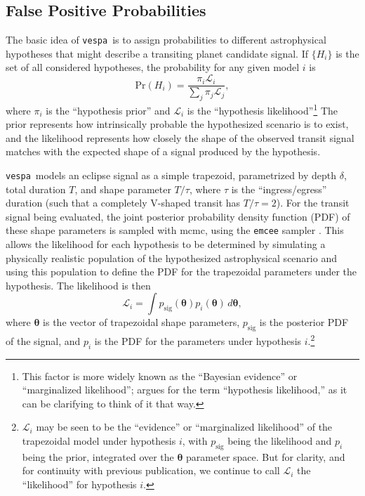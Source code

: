 \documentclass[preprint2]{aastex}
\newcommand{\vespa}{\texttt{vespa}}
\newcommand{\bvec}[1]{{\ensuremath{\boldsymbol{#1}}}}
\begin{document}

\subsection{False Positive Probabilities}
\label{sec:methods:fpp}

The basic idea of \vespa\ is to assign probabilities to different
astrophysical hypotheses that might describe a transiting planet
candidate signal.  If $\{H_i\}$ is the set of all considered
hypotheses, the probability for any given model $i$ is
\begin{equation}
  \label{eq:prob}
  \mathrm{Pr}\left(H_i\right) = \frac{\pi_i \mathcal
    L_i}{\displaystyle \sum_j \pi_j \mathcal L_j},
\end{equation}
where $\pi_i$ is the ``hypothesis prior'' and $\mathcal L_i$ is the
``hypothesis likelihood''\footnote{This factor is more widely known as
  the ``Bayesian evidence'' or ``marginalized likelihood'';
  \citet{Morton:2014b} argues for the term ``hypothesis likelihood,''
  as it can be clarifying to think of it that way.}
The prior represents how intrinsically probable the hypothesized
scenario is to exist, and the likelihood represents how closely the
shape of the observed transit signal matches with the expected shape
of a signal produced by the hypothesis.

\vespa\ models an eclipse signal as a simple trapezoid, parametrized
by depth $\delta$, total duration $T$, and shape parameter $T / \tau$,
where $\tau$ is the ``ingress/egress'' duration (such that a
completely V-shaped transit has $T/\tau = 2$).  For the transit signal
being evaluated, the joint posterior probability density function
(PDF) of these shape parameters is sampled with \ac{mcmc}, using the
\texttt{emcee} sampler \citep{emcee}.  This allows the likelihood for
each hypothesis to be determined by simulating a physically realistic
population of the hypothesized astrophysical scenario and using this
population to define the PDF for the trapezoidal parameters under the
hypothesis.  The likelihood is then
\begin{equation}
  \label{eq:lhood}
  \mathcal L_i = \displaystyle \int p_\mathrm{sig}\left(\bvec{\theta}\right)
                                    p_i\left(\bvec{\theta}\right)\,d\bvec{\theta},
\end{equation}
where $\bvec{\theta}$ is the vector of trapezoidal shape parameters,
$p_\mathrm{sig}$ is the posterior PDF of the signal, and $p_i$ is the
PDF for the parameters under hypothesis $i$.\footnote{$\mathcal L_i$
  may be seen to be the ``evidence'' or ``marginalized likelihood'' of
  the trapezoidal model under hypothesis $i$, with $p_\mathrm{sig}$
  being the likelihood and $p_i$ being the prior, integrated over the
  $\bvec{\theta}$ parameter space.  But for clarity, and for
  continuity with previous publication, we continue to call $\mathcal
  L_i$ the ``likelihood'' for hypothesis $i$.}
\end{document}
